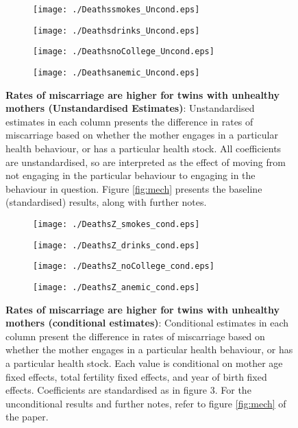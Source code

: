 \documentclass{nature}
\begin{document}
\begin{linenumbers}
\begin{spacing}{1}
\begin{figure}[htpb!]
\begin{subfigure}{.5\textwidth}
  \texttt{[image: ./Deathssmokes\_Uncond.eps]}
\end{subfigure}%
\begin{subfigure}{.5\textwidth}
  \texttt{[image: ./Deathsdrinks\_Uncond.eps]}
\end{subfigure}
\begin{subfigure}{.5\textwidth}
  \texttt{[image: ./DeathsnoCollege\_Uncond.eps]}
\end{subfigure}%
\begin{subfigure}{.5\textwidth}
  \texttt{[image: ./Deathsanemic\_Uncond.eps]}
\end{subfigure}
\vspace{5mm}
\caption{\textbf{Rates of miscarriage are higher for twins with unhealthy mothers (Unstandardised Estimates)}: {\footnotesize Unstandardised estimates in each column presents the difference in rates of miscarriage based on whether the mother engages in a particular health behaviour, or has a particular health stock.  All coefficients are unstandardised, so are interpreted as the effect of moving from not engaging in the particular behaviour to engaging in the behaviour in question. Figure \ref{fig:mech} presents the baseline (standardised) results, along with further notes.}}
\label{fig:miscarriageUnstand}
\end{figure}

\begin{figure}[htpb!]
\begin{subfigure}{.5\textwidth}
  \texttt{[image: ./DeathsZ\_smokes\_cond.eps]}
\end{subfigure}%
\begin{subfigure}{.5\textwidth}
  \texttt{[image: ./DeathsZ\_drinks\_cond.eps]}
\end{subfigure}
\begin{subfigure}{.5\textwidth}
  \texttt{[image: ./DeathsZ\_noCollege\_cond.eps]}
\end{subfigure}%
\begin{subfigure}{.5\textwidth}
  \texttt{[image: ./DeathsZ\_anemic\_cond.eps]}
\end{subfigure}
\vspace{5mm}
\caption{\textbf{Rates of miscarriage are higher for twins with unhealthy mothers (conditional estimates)}: {\footnotesize Conditional estimates in each column present the difference in rates of miscarriage based on whether the mother engages in a particular health behaviour, or has a particular health stock.  Each value is conditional on mother age fixed effects, total fertility fixed effects, and year of birth fixed effects. Coefficients are standardised as in figure 3. For the unconditional results and further notes, refer to figure \ref{fig:mech} of the paper.}}
\label{fig:miscarriageCond}
\end{figure}


\end{spacing}
\end{linenumbers}
\end{document}

